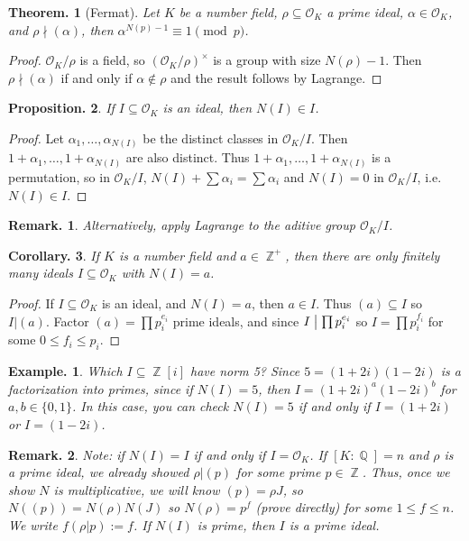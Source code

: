 \documentclass[11pt, a4paper]{memoir}
\DeclareMathOperator{\Q}{{\mathbb{Q}}}
\DeclareMathOperator{\Z}{{\mathbb{Z}}}
\renewcommand{\div}{\bigm|}
\theoremstyle{change}
\newtheorem{theorem}{Theorem.}[section]
\newtheorem{corollary}[theorem]{Corollary.}
\newtheorem{proposition}[theorem]{Proposition.}
\theoremstyle{plain}
\theoremstyle{nonumberplain}
\newtheorem{example}{Example.}
\newtheorem{remark}{Remark.}
\newtheorem{proof}{Proof}
\begin{document}
\begin{theorem}[Fermat]
    Let $K$ be a number field, $\rho\subseteq\mathcal{O}_K$ a prime ideal, $\alpha\in\mathcal{O}_K$, and $\rho\nmid(\alpha)$, then $\alpha^{N(p)-1}\equiv 1\pmod{p}$.
\end{theorem}
\begin{proof}
    $\mathcal{O}_K/\rho$ is a field, so $(\mathcal{O}_K/\rho)^\times$ is a group with size $N(\rho)-1$.
    Then $\rho\nmid(\alpha)$ if and only if $\alpha\notin\rho$ and the result follows by Lagrange.
\end{proof}
\begin{proposition}
    If $I\subseteq\mathcal{O}_K$ is an ideal, then $N(I)\in I$.
\end{proposition}
\begin{proof}
    Let $\alpha_1,\ldots,\alpha_{N(I)}$ be the distinct classes in $\mathcal{O}_K/I$.
    Then $1+\alpha_1,\ldots,1+\alpha_{N(I)}$ are also distinct.
    Thus $1+\alpha_1,\ldots,1+\alpha_{N(I)}$ is a permutation, so in $\mathcal{O}_K/I$, $N(I)+\sum\alpha_i=\sum\alpha_i$ and $N(I)=0$ in $\mathcal{O}_K/I$, i.e. $N(I)\in I$.
\end{proof}
\begin{remark}
    Alternatively, apply Lagrange to the aditive group $\mathcal{O}_K/I$.
\end{remark}
\begin{corollary}
    If $K$ is a number field and $a\in\Z^+$, then there are only finitely many ideals $I\subseteq\mathcal{O}_K$ with $N(I)=a$.
\end{corollary}
\begin{proof}
    If $I\subseteq\mathcal{O}_K$ is an ideal, and $N(I)=a$, then $a\in I$.
    Thus $(a)\subseteq I$ so $I|(a)$.
    Factor $(a)=\prod p_i^{e_i}$ prime ideals, and since $I\div\prod p_i^{e_i}$ so $I=\prod p_i^{f_i}$ for some $0\leq f_i\leq p_i$.
\end{proof}
\begin{example}
    Which $I\subseteq\Z[i]$ have norm 5?
    Since $5=(1+2i)(1-2i)$ is a factorization into primes, since if $N(I)=5$, then $I=(1+2i)^a(1-2i)^b$ for $a,b\in\{0,1\}$.
    In this case, you can check $N(I)=5$ if and only if $I=(1+2i)$ or $I=(1-2i)$.
\end{example}
\begin{remark}
    Note: if $N(I)=I$ if and only if $I=\mathcal{O}_K$.
    If $[K:\Q]=n$ and $\rho$ is a prime ideal, we already showed $\rho|(p)$ for some prime $p\in\Z$.
    Thus, once we show $N$ is multiplicative, we will know $(p)=\rho J$, so $N((p))=N(\rho)N(J)$ so $N(\rho)=p^f$ (prove directly) for some $1\leq f\leq n$.
    We write $f(\rho|p):=f$.
    If $N(I)$ is prime, then $I$ is a prime ideal.
\end{remark}
\end{document}
